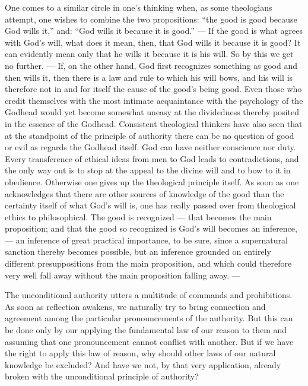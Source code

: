 \documentclass[12pt,a4paper,openany]{book}
\newcommand{\opage}[1]{\marginnote{\footnotesize\textit{[#1]}}}
\begin{document}
One comes to a similar circle in one's thinking when, as some theologians attempt, one wishes to
combine the two propositions:
\opage{17}``the good is good because God wills it,'' and: ``God wills it because it is good.'' --- If the good
is what agrees with God's will, what does it mean, then, that God wills it because it is good? It can
evidently mean only that he wills it because it is his will. So by this we get no further. --- If,
on the other hand, God first recognizes something as good and then wills it, then there is a law
and rule to which his will bows, and his will is therefore not in and for itself the cause of the
good's being good. Even those who credit themselves with the most intimate acquaintance with the
psychology of the Godhead would yet become somewhat uneasy at the dividedness thereby posited in the
essence of the Godhead. Consistent theological thinkers have also seen that at the standpoint of the
principle of authority there can be no question of good or evil as regards the Godhead itself. God
can have neither conscience nor duty. Every transference of ethical ideas from men to God leads to
contradictions, and the only way out is to stop at the appeal to the divine will and to bow to it in
obedience. Otherwise one gives up the theological principle itself. As soon as one acknowledges that
there are other sources of knowledge of the good than the certainty itself of what God's will is,
one has really passed over from theological ethics to philosophical. The good is recognized --- that
becomes the main proposition; and that the good so recognized is God's will becomes an inference,
--- an inference of great practical importance, to be sure, since a supernatural sanction thereby
becomes possible, but an inference grounded on entirely different presuppositions from the main
proposition, and which could therefore very well fall away without the main proposition falling
away. ---

The unconditional authority utters a multitude of commands and prohibitions. As soon as reflection
awakens, we naturally try to bring connection and agreement among the particular pronouncements of
the authority. But this can be done only by our applying the fundamental law of our reason to them
and assuming that one pronouncement cannot conflict with another. But if we have the right to apply
this law of reason, why should other laws of our natural knowledge be excluded?
\opage{18}And have we not, by that very application, already broken with the unconditional principle of
authority?
\end{document}
